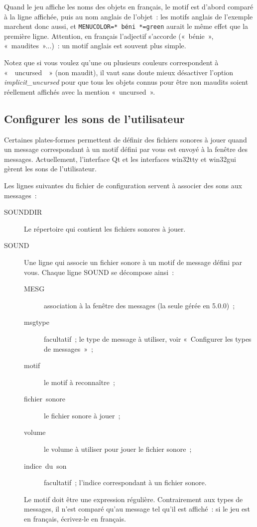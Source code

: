 \documentclass[titlepage]{article}
\begin{document}
Quand le jeu affiche les noms des objets en français, le motif est d'abord
comparé à la ligne affichée, puis au nom anglais de l'objet~: les motifs
anglais de l'exemple marchent donc aussi, et
\texttt{MENUCOLOR=\textquotedbl{}* béni *\textquotedbl{}=green} aurait le même effet que la première
ligne.
Attention, en français l'adjectif s'accorde («~bénie~»,
«~maudites~»...)~: un motif anglais est souvent plus simple.


Notez que si vous voulez qu'une ou plusieurs couleurs correspondent à
«~~uncursed~~» (non maudit), il vaut sans doute mieux désactiver
l'option
\textit{implicit\_uncursed}
pour que tous les objets connus pour être non maudits soient réellement
affichés avec la mention «~uncursed~».

\subsection{Configurer les sons de l'utilisateur}



Certaines plates-formes permettent de définir des fichiers sonores à jouer
quand un message correspondant à un motif défini par vous est envoyé à la
fenêtre des messages.
Actuellement, l'interface Qt et les interfaces win32tty et win32gui
gèrent les sons de l'utilisateur.


Les lignes suivantes du fichier de configuration servent à associer des
sons aux messages~:

\begin{description}
\item[{SOUNDDIR}]
Le répertoire qui contient les fichiers sonores à jouer.

\item[{SOUND}]
Une ligne qui associe un fichier sonore à un motif de message défini par
vous.
Chaque ligne SOUND se décompose ainsi~:
\begin{description}
\item[{MESG}]
association à la fenêtre des messages (la seule gérée en 5.0.0)~;
\item[{msgtype}]
facultatif~; le type de message à utiliser, voir «~Configurer les
types de messages~»~;
\item[{motif}]
le motif à reconnaître~;
\item[{fichier~sonore}]
le fichier sonore à jouer~;
\item[{volume}]
le volume à utiliser pour jouer le fichier sonore~;
\item[{indice~du~son}]
facultatif~; l'indice correspondant à un fichier sonore.
\end{description}


Le motif doit être une expression régulière.
Contrairement aux types de messages, il n'est comparé qu'au message tel
qu'il est affiché~: si le jeu est en français, écrivez-le en français.

\end{description}
\end{document}
